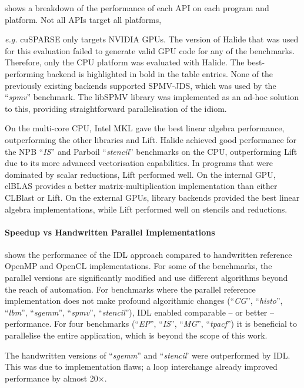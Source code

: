      shows a breakdown of the performance of each API
    on each program and platform.
    Not all APIs target all platforms, {\emph{e.g.} cuSPARSE only targets NVIDIA
    GPUs.
    The version of Halide that was used for this evaluation failed to generate
    valid GPU code for any of the benchmarks.
    Therefore, only the CPU platform was evaluated with Halide.
    The best-performing backend is highlighted in bold in the table entries.
    None of the previously existing backends supported SPMV-JDS, which was used
    by the ``\emph{spmv}'' benchmark.
    The libSPMV library was implemented as an ad-hoc solution to this,
    providing straightforward parallelisation of the idiom.

    On the multi-core CPU, Intel MKL gave the best linear algebra performance,
    outperforming the other libraries and Lift.
    Halide achieved good performance for the NPB ``\emph{IS}'' and Parboil
    ``\emph{stencil}'' benchmarks on the CPU, outperforming Lift due to its more
    advanced vectorisation capabilities.
    In programs that were dominated by scalar reductions, Lift performed well.
    On the internal GPU, clBLAS provides a better matrix-multiplication
    implementation than either CLBlast or Lift.
    On the external GPUs, library backends provided the best linear algebra
    implementations, while Lift performed well on stencils and reductions.

\paragraph*{Speedup vs Handwritten Parallel Implementations}

     shows the performance of the IDL approach
    compared to handwritten reference OpenMP and OpenCL implementations.
    For some of the benchmarks, the parallel versions are significantly modified
    and use different algorithms beyond the reach of automation.
    For benchmarks where the parallel reference implementation does not make
    profound algorithmic changes (``\emph{CG}'', ``\emph{histo}'',
    ``\emph{lbm}'', ``\emph{sgemm}'', ``\emph{spmv}'', ``\emph{stencil}''),
    IDL enabled comparable -- or better -- performance.
    For four benchmarks (``\emph{EP}'', ``\emph{IS}'', ``\emph{MG}'',
   ``\emph{tpacf}'') it is beneficial to parallelise the entire application,
    which is beyond the scope of this work.

    The handwritten versions of ``\emph{sgemm}'' and ``\emph{stencil}' were
    outperformed by IDL.
    This was due to implementation flaws; a loop interchange already improved
    performance by almost 20$\times$.

}
